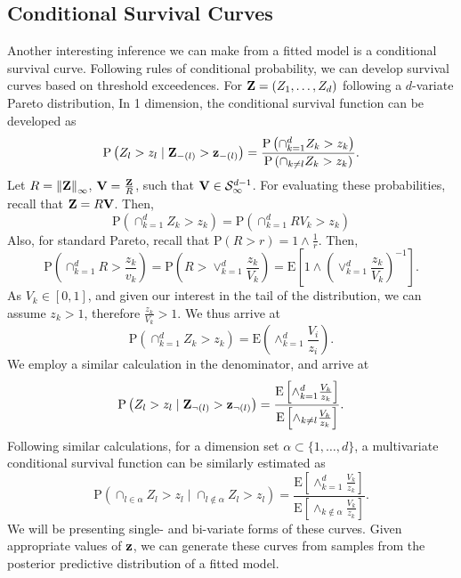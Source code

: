 \subsection{Conditional Survival Curves}
Another interesting inference we can make from a fitted model is a conditional survival curve.
  Following rules of conditional probability, we can develop survival curves based on
  threshold exceedences. For ${\bf Z} = (Z_1,\ldots,Z_d)$ following a $d$-variate Pareto distribution,
  In 1 dimension, the conditional survival function can be developed as
  \begin{equation}
    \label{eqn:condsurv1d}
    \text{P}\left(Z_l > z_l\mid {\bf Z}_{-(l)} > {\bf z}_{-(l)}\right) =
      \frac{\text{P}\left(\cap_{k = 1}^d Z_k > z_k\right)}{\text{P}\left(\cap_{k \neq l} Z_k > z_k\right)}.
  \end{equation}
  Let $R = \left\lVert {\bf Z} \right\rVert_{\infty}$, ${\bf V} = \frac{{\bf Z}}{R}$, such that ${\bf V}\in \mathcal{S}_{\infty}^{d-1}$.
  For evaluating these probabilities, recall that ${\bf Z} = R{\bf V}$.  Then,
  \begin{equation}
    \text{P}\left(\cap_{k = 1}^d Z_k > z_k\right) = \text{P}\left(\cap_{k = 1}^d RV_k > z_k\right)
  \end{equation}
  Also, for standard Pareto, recall that $\text{P}(R > r) = 1\wedge\frac{1}{r}$.  Then,
  \begin{equation}
    \text{P}\left(\cap_{k = 1}^d R > \frac{z_k}{v_k}\right) =
      \text{P}\left(R  > \vee_{k=1}^d\frac{z_k}{V_k}\right) =
      \text{E}\left[1 \wedge \left(\vee_{k = 1}^d\frac{z_k}{V_k}\right)^{-1}\right].
  \end{equation}
  As $V_k \in [0,1]$, and given our interest in the tail of the distribution, we can assume $z_k > 1$,
  therefore $\frac{z_k}{V_k} > 1$.  We thus arrive at
  \begin{equation}
    \text{P}\left(\cap_{k = 1}^dZ_k > z_k\right) = \text{E}\left(\wedge_{k = 1}^d\frac{V_i}{z_i}\right).
  \end{equation}
  We employ a similar calculation in the denominator, and arrive at
  \begin{equation}
    \label{eqn:condsurv1df}
    \text{P}\left(Z_l > z_l\mid {\bf Z}_{\neg(l)} > {\bf z}_{\neg(l)}\right) =
      \frac{\text{E}\left[\wedge_{k = 1}^d \frac{V_k}{z_k}\right]}{\text{E}\left[\wedge_{k \neq l}\frac{V_k}{z_k}\right]}.
  \end{equation}
  Following similar calculations, for a dimension set $\alpha \subset \{1,\ldots, d\}$, a multivariate
  conditional survival function can be similarly estimated as
  \begin{equation}
    \label{eqn:condsurv2df}
    \text{P}\left(\cap_{l \in \alpha} Z_l > z_l \mid \cap_{l\not\in\alpha} Z_l > z_l\right) =
      \frac{\text{E}\left[\wedge_{k = 1}^d \frac{V_k}{z_k}\right]}{\text{E}\left[\wedge_{k \not\in\alpha}\frac{V_k}{z_k}\right]}.
  \end{equation}
  We will be presenting single- and bi-variate forms of these curves.   Given appropriate values of
  ${\bf z}$, we can generate these curves from samples from the posterior predictive distribution of
  a fitted model.

